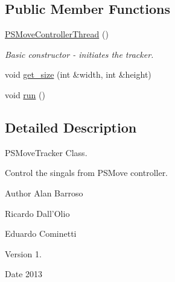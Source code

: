 \subsection*{Public Member Functions}
\begin{DoxyCompactItemize}
\item 
\hypertarget{class_p_s_move_controller_thread_a5c444d32e7c355abc67015f38a243eec}{\hyperlink{class_p_s_move_controller_thread_a5c444d32e7c355abc67015f38a243eec}{P\-S\-Move\-Controller\-Thread} ()}\label{class_p_s_move_controller_thread_a5c444d32e7c355abc67015f38a243eec}

\begin{DoxyCompactList}\small\item\em Basic constructor -\/ initiates the tracker. \end{DoxyCompactList}\item 
void \hyperlink{class_p_s_move_controller_thread_aaf1c7e2261c7e423a51e43e376de3218}{get\-\_\-size} (int \&width, int \&height)
\item 
void \hyperlink{class_p_s_move_controller_thread_ab3e95646bb01676f2033ea2fc398b821}{run} ()
\end{DoxyCompactItemize}


\subsection{Detailed Description}
P\-S\-Move\-Tracker Class. 

Control the singals from P\-S\-Move controller. \begin{DoxyAuthor}{Author}
Alan Barroso 

Ricardo Dall'Olio 

Eduardo Cominetti 
\end{DoxyAuthor}
\begin{DoxyVersion}{Version}
1. 
\end{DoxyVersion}
\begin{DoxyDate}{Date}
2013 
\end{DoxyDate}


